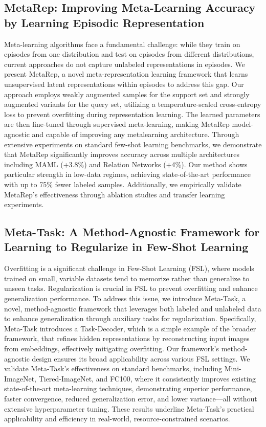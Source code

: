 \subsection{MetaRep: Improving Meta-Learning Accuracy by Learning Episodic Representation}

Meta-learning algorithms face a fundamental challenge: while they train on episodes from one distribution and test on episodes from different distributions, current approaches do not capture unlabeled representations in episodes. We present MetaRep, a novel meta-representation learning framework that learns unsupervised latent representations within episodes to address this gap. Our approach employs weakly augmented samples for the support set and strongly augmented variants for the query set, utilizing a temperature-scaled cross-entropy loss to prevent overfitting during representation learning. The learned parameters are then fine-tuned through supervised meta-learning, making MetaRep model-agnostic and capable of improving any metalearning architecture. Through extensive experiments on standard few-shot learning benchmarks, we demonstrate that MetaRep significantly improves accuracy across multiple architectures including MAML (+3.8\%) and Relation Networks (+4\%). Our method shows particular strength in low-data regimes, achieving state-of-the-art performance with up to 75\% fewer labeled samples. Additionally, we empirically validate MetaRep’s effectiveness through ablation studies and transfer learning experiments.

\subsection{Meta-Task: A Method-Agnostic Framework for Learning to Regularize in Few-Shot Learning}

Overfitting is a significant challenge in Few-Shot Learning (FSL), where models trained on small, variable datasets tend to memorize rather than generalize to unseen tasks. Regularization is crucial in FSL to prevent overfitting and enhance generalization performance. To address this issue, we introduce Meta-Task, a novel, method-agnostic framework that leverages both labeled and unlabeled data to enhance generalization through auxiliary tasks for regularization. Specifically, Meta-Task introduces a Task-Decoder, which is a simple example of the broader framework, that refines hidden representations by reconstructing input images from embeddings, effectively mitigating overfitting. Our framework’s method-agnostic design ensures its broad applicability across various FSL settings. We validate Meta-Task’s effectiveness on standard benchmarks, including Mini-ImageNet, Tiered-ImageNet, and FC100, where it consistently improves existing state-of-the-art meta-learning techniques, demonstrating superior performance, faster convergence, reduced generalization error, and lower variance—all without extensive hyperparameter tuning. These results underline Meta-Task’s practical applicability and efficiency in real-world, resource-constrained scenarios.

